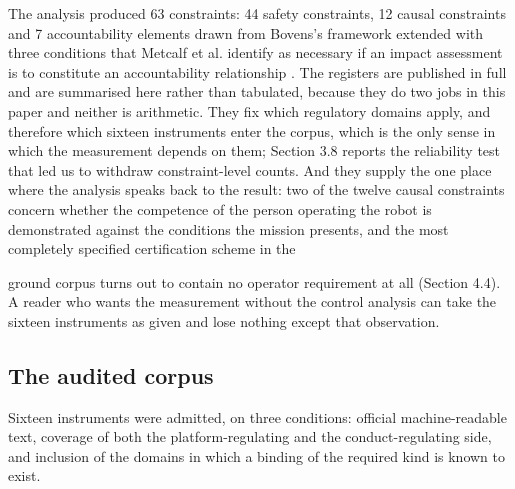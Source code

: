 The analysis produced 63 constraints: 44 safety constraints, 12 causal constraints and 7 accountability elements drawn from Bovens's framework \citep{Bovens2007Accountability} extended with three conditions that Metcalf et al. identify as necessary if an impact assessment is to constitute an accountability relationship \citep{Metcalf2021AIA}. The registers are published in full and are summarised here rather than tabulated, because they do two jobs in this paper and neither is arithmetic. They fix which regulatory domains apply, and therefore which sixteen instruments enter the corpus, which is the only sense in which the measurement depends on them; Section 3.8 reports the reliability test that led us to withdraw constraint-level counts. And they supply the one place where the analysis speaks back to the result: two of the twelve causal constraints concern whether the competence of the person operating the robot is demonstrated against the conditions the mission presents, and the most completely specified certification scheme in the

ground corpus turns out to contain no operator requirement at all (Section 4.4). A reader who wants the measurement without the control analysis can take the sixteen instruments as given and lose nothing except that observation.

\subsection{The audited corpus}\label{sec:2.3}

Sixteen instruments were admitted, on three conditions: official machine-readable text, coverage of both the platform-regulating and the conduct-regulating side, and inclusion of the domains in which a binding of the required kind is known to exist.

